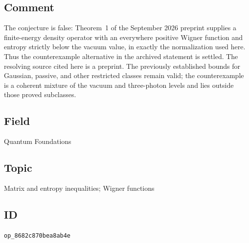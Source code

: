 \subsection*{Comment}

The conjecture is false: Theorem~1 of the September 2026 preprint  supplies a finite-energy density operator with an everywhere positive Wigner function and entropy strictly below the vacuum value, in exactly the normalization used here. Thus the counterexample alternative in the archived statement is settled. The resolving source cited here is a preprint. The previously established bounds for Gaussian, passive, and other restricted classes remain valid; the counterexample is a coherent mixture of the vacuum and three-photon levels and lies outside those proved subclasses.

\subsection*{Field}

Quantum Foundations

\subsection*{Topic}

Matrix and entropy inequalities; Wigner functions

\subsection*{ID}

\texttt{op\_8682c870bea8ab4e}
